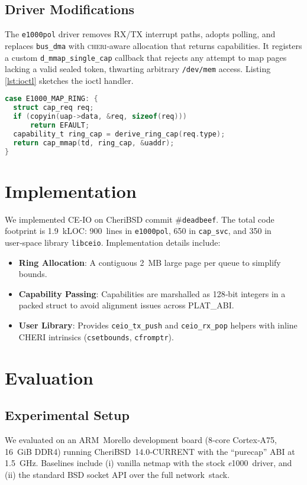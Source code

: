 \documentclass[sigconf]{acmart}
\newcommand{\cheri}{\textsc{cheri}\xspace}
\newcommand{\e}{\textit{e}1000\xspace}
\begin{document}
\subsection{Driver Modifications}
The \texttt{e1000pol} driver removes RX/TX interrupt paths, adopts polling, and replaces \texttt{bus\_dma} with \cheri‑aware allocation that returns capabilities. It registers a custom \texttt{d\_mmap\_single\_cap} callback that rejects any attempt to map pages lacking a valid sealed token, thwarting arbitrary \texttt{/dev/mem} access. Listing\,\ref{lst:ioctl} sketches the ioctl handler.

\begin{lstlisting}[language=C,caption={Capability‑aware ioctl in \texttt{e1000pol}.},label={lst:ioctl}]
case E1000_MAP_RING: {
  struct cap_req req;
  if (copyin(uap->data, &req, sizeof(req)))
      return EFAULT;
  capability_t ring_cap = derive_ring_cap(req.type);
  return cap_mmap(td, ring_cap, &uaddr);
}
\end{lstlisting}

\section{Implementation}
\label{sec:impl}
We implemented CE‑IO on CheriBSD commit #\texttt{deadbeef}. The total code footprint is 1.9 kLOC: 900 lines in \texttt{e1000pol}, 650 in \texttt{cap\_svc}, and 350 in user‑space library \texttt{libceio}. Implementation details include:
\begin{itemize}
    \item \textbf{Ring Allocation}: A contiguous 2 MB large page per queue to simplify bounds.
    \item \textbf{Capability Passing}: Capabilities are marshalled as 128‑bit integers in a packed struct to avoid alignment issues across PLAT_ABI.
    \item \textbf{User Library}: Provides \texttt{ceio\_tx\_push} and \texttt{ceio\_rx\_pop} helpers with inline CHERI intrinsics (\texttt{csetbounds}, \texttt{cfromptr}).
\end{itemize}

\section{Evaluation}
\label{sec:eval}
\subsection{Experimental Setup}
We evaluated on an ARM Morello development board (8‑core Cortex‑A75, 16 GiB DDR4) running CheriBSD 14.0‑CURRENT with the “purecap” ABI at \SI{1.5}{\giga\hertz}. Baselines include (i) vanilla netmap with the stock \e driver, and (ii) the standard BSD socket API over the full network stack.
\end{document}
